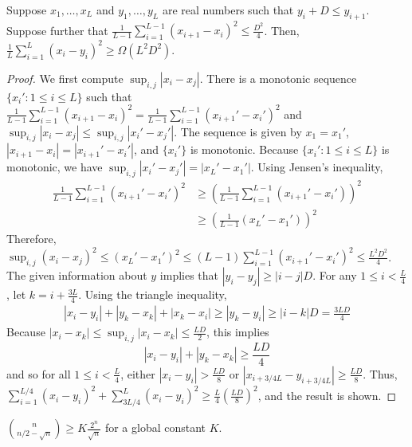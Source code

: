 \begin{lemma}\label{lem:tradeoff-inequality}
Suppose $x_1,\ldots, x_L$ and $y_1,\ldots, y_L$ are real numbers such that $y_{i} + D \leq y_{i+1}$. Suppose further that $\frac{1}{L-1}\sum_{i=1}^{L-1} (x_{i+1} - x_i)^2 \leq \frac{D^2}{4}$. Then, 
$\frac{1}{L} \sum_{i=1}^L (x_i-y_i)^2 \geq \Omega(L^2D^2)$.
\end{lemma}
\begin{proof}
We first compute $\sup_{i,j} |x_i - x_j|$. There is a monotonic sequence $\{x_i'
: 1\leq i \leq L\}$ such that $\frac{1}{L-1}\sum_{i=1}^{L-1} (x_{i+1}-x_i)^2 =
\frac{1}{L-1} \sum_{i=1}^{L-1} (x_{i+1}' - x_{i}')^2$ and $\sup_{i,j}|x_i - x_j|
\leq \sup_{i,j}|x_i' - x_j'|$. The sequence is given 
by $x_1 = x_1'$, $|x_{i+1}-x_i| = |x_{i+1}'-x_i'|$, and $\{x_i'\}$ is monotonic. 
Because
$\{x_i' : 1 \leq i \leq L \}$ is monotonic, we have $\sup_{i,j}|x_i'-x_j'| = |x_L' - x_1'|$.
Using Jensen's inequality,
\begin{align*}
    \frac{1}{L-1}\sum_{i=1}^{L-1} (x_{i+1}'-x_i')^2 &\geq \left( \frac{1}{L-1}
    \sum_{i=1}^{L-1} (x_{i+1}' - x_i') \right)^2 \\
    &\geq \left( \frac{1}{L-1} (x_L' - x_1')\right)^2
\end{align*}
Therefore, $\sup_{i,j}(x_i - x_j)^2 \leq (x_L' - x_1')^2 \leq (L-1)
\sum_{i=1}^{L-1} (x_{i+1}' - x_i')^2 \leq \frac{L^2D^2}{4}$. The given
information about $y$ implies that $|y_i - y_j| \geq |i-j|D$.
For any $1 \leq i < \frac{L}{4}$, let $k = i + \frac{3L}{4}$. Using the triangle inequality,
\begin{align*}
    |x_i - y_i| + |y_k - x_k| + |x_k - x_i| \geq 
    |y_k - y_i|
    \geq 
    |i-k|D
    = \frac{3LD}{4}
\end{align*}
Because $|x_i - x_k| \leq \sup_{i,j} |x_i-x_k| \leq \frac{LD}{2}$, this implies
\[
|x_i - y_i| + |y_k - x_k| \geq \frac{LD}{4}
\]
and so for all $1 \leq i < \frac{L}{4}$, either $|x_i - y_i| > \frac{LD}{8}$ or $|x_{i+3/4L} - y_{i+3/4L}| \geq \frac{LD}{8}$. 
Thus, $\sum_{i=1}^{L/4} (x_i - y_i)^2 + \sum_{3L/4}^L (x_i - y_i)^2 \geq \frac{L}{4} (\frac{LD}{8})^2$, and the result is shown.
\end{proof}
\begin{lemma}\label{lem:binom}
  $\binom{n}{n/2-\sqrt{n}} \geq K \frac{2^n}{\sqrt{n}}$ for a global constant $K$.
\end{lemma}
